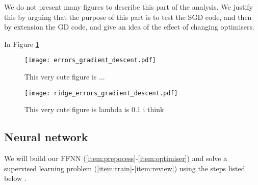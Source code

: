     We do not present many figures to describe this part of the analysis. We justify this by arguing that the purpose of this part is to test the SGD code, and then by extension the GD code, and give an idea of the effect of changing optimisers. 

    In Figure \ref{fig:simple_reg_errors_ols}  \fillertext

    \begin{figure}
        \texttt{[image: errors\_gradient\_descent.pdf]}
        \caption{This very cute figure is ...}
        \label{fig:simple_reg_errors_ols}
    \end{figure}

    \begin{figure}
        \texttt{[image: ridge\_errors\_gradient\_descent.pdf]}
        \caption{This very cute figure is  lambda is 0.1 i think}
        \label{fig:simple_reg_errors_ridge}
    \end{figure}




    
\subsection{Neural network}
    We will build our FFNN (\ref{item:prepocess}-\ref{item:optimiser}) and solve a supervised learning problem (\ref{item:train}-\ref{item:review}) using the steps listed below \citep{mhjensen}.

